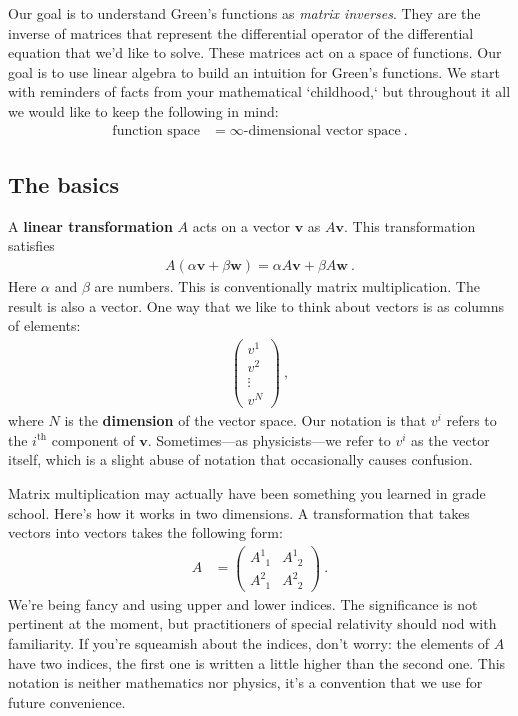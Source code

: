 \documentclass[12pt]{article}
\numberwithin{equation}{section}    %
\renewcommand{\vec}[1]{\mathbf{#1}} %
\begin{document}
Our goal is to understand Green’s functions as \emph{matrix inverses}. They are the inverse of matrices that represent the differential operator of the differential equation that we’d like to solve. These matrices act on a space of functions. Our goal is to use linear algebra to build an intuition for Green’s functions. We start with reminders of facts from your mathematical `childhood,` but throughout it all we would like to keep the following in mind:
\begin{align}
  \text{function space} &= \infty\text{-dimensional vector space} \ .
\end{align}

\subsection{The basics}

A \textbf{linear transformation} $A$ acts on a vector $\vec{v}$ as $A\vec{v}$. 
This transformation satisfies
\begin{align}
  A(\alpha \vec{v}+ \beta \vec{w}) = \alpha A\vec{v} + \beta A\vec{w} \ .
\end{align}
Here $\alpha$ and $\beta$ are numbers.
%
This is conventionally matrix multiplication. The result is also a vector. One way that we like to think about vectors is as columns of elements:
\begin{align}
  \begin{pmatrix}
    v^{1} \\ v^{2} \\ \vdots \\ v^{N}
  \end{pmatrix} \ ,
\end{align}
where $N$ is the \textbf{dimension} of the vector space. Our notation is that $v^i$ refers to the $i^\text{th}$ component of $\vec{v}$. Sometimes---as physicists---we refer to $v^i$ as the vector itself, which is a slight abuse of notation that occasionally causes confusion.

Matrix multiplication may actually have been something you learned in grade school. Here’s how it works in two dimensions. A transformation that takes vectors into vectors takes the following form:
\begin{align}
  A &= 
  \begin{pmatrix}
   A^{1}_{\phantom{1}1} & A^{1}_{\phantom{1}2}
   \\
   A^{2}_{\phantom{1}1} & A^{2}_{\phantom{1}2}
  \end{pmatrix} \ .
\end{align}
We’re being fancy and using upper and lower indices. The significance is not pertinent at the moment, but practitioners of special relativity should nod with familiarity. If you’re squeamish about the indices, don’t worry: the elements of $A$ have two indices, the first one is written a little higher than the second one. This notation is neither mathematics nor physics, it’s a convention that we use for future convenience.
\end{document}
